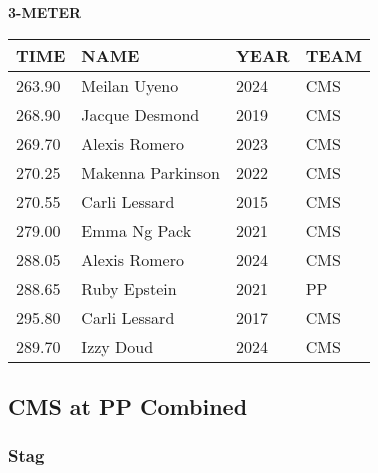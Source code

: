 \vspace{0.4cm}

\begin{center}
\begin{minipage}[t]{0.7\textwidth}
\centering
\textbf{3-METER}\\[0.05cm]
\begin{tabular}{@{}p{1.8cm}p{2.8cm}p{1.2cm}p{1.4cm}@{}}
\hline
\textbf{TIME} & \textbf{NAME} & \textbf{YEAR} & \textbf{TEAM} \\
\hline
263.90 & Meilan Uyeno & 2024 & CMS \\
268.90 & Jacque Desmond & 2019 & CMS \\
269.70 & Alexis Romero & 2023 & CMS \\
270.25 & Makenna Parkinson & 2022 & CMS \\
270.55 & Carli Lessard & 2015 & CMS \\
279.00 & Emma Ng Pack & 2021 & CMS \\
288.05 & Alexis Romero & 2024 & CMS \\
288.65 & Ruby Epstein & 2021 & PP \\
295.80 & Carli Lessard & 2017 & CMS \\
289.70 & Izzy Doud & 2024 & CMS \\
\hline
\end{tabular}
\end{minipage}
\end{center}

\vspace{0.4cm}

\newpage

\subsection{CMS at PP Combined}
\subsubsection{Stag}

